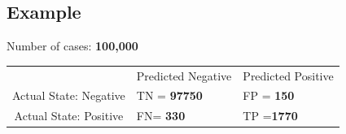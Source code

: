 \documentclass[]{report}
\begin{document}



\subsection*{Example}
Number of cases: \textbf{100,000}\\ 
\begin{center}


\begin{tabular}{|c|l|l|}
\hline
 &  {Predicted Negative} & {Predicted Positive}\\
Actual State: Negative   & \phantom{spa} TN = \textbf{97750}   & \phantom{spa}FP  = \textbf{150}\phantom{spa}\\
Actual State: Positive   & \phantom{spa} FN= \textbf{330} \phantom{spa}   & \phantom{spa}TP  =\textbf{1770}\phantom{spa}\\

\end{tabular}

\end{center}
\end{document}
